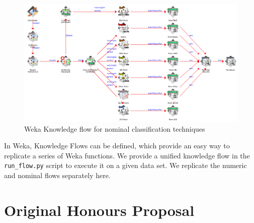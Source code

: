 \begin{landscape}
\begin{figure}[H]
\centering
\includegraphics[width=\linewidth]{../diagrams/knowledgeflow-nominal.png}
\caption{Weka Knowledge flow for nominal classification techniques}
\end{figure}

In Weka, Knowledge Flows can be defined, which provide an easy way to replicate a series of Weka functions. We provide a unified knowledge flow in the \texttt{run\_flow.py} script to execute it on a given data set. We replicate the numeric and nominal flows separately here.
\end{landscape}

\chapter{Original Honours Proposal}
